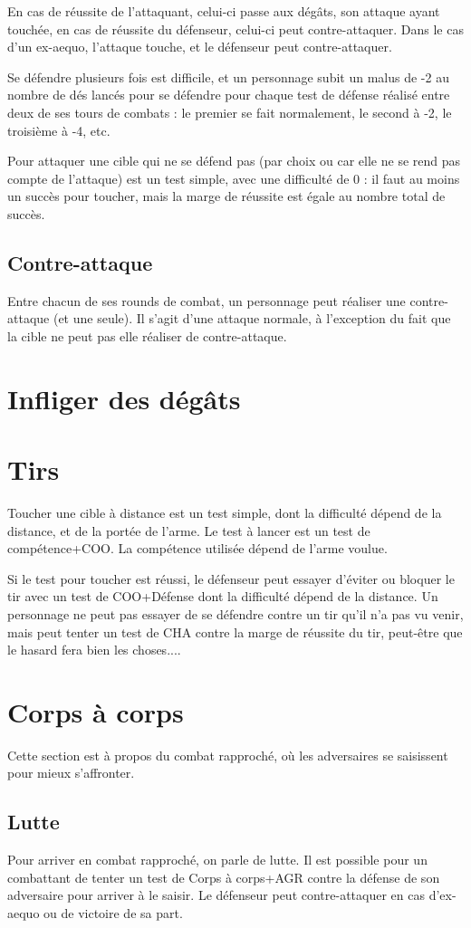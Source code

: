 \documentclass[10pt,a4paper,twocolumn]{book}
\begin{document}
En cas de réussite de l'attaquant, celui-ci passe aux dégâts, son attaque ayant touchée, en cas de réussite du défenseur, celui-ci peut contre-attaquer. Dans le cas d'un ex-aequo, l'attaque touche, et le défenseur peut contre-attaquer.

Se défendre plusieurs fois est difficile, et un personnage subit un malus de -2 au nombre de dés lancés pour se défendre pour chaque test de défense réalisé entre deux de ses tours de combats : le premier se fait normalement, le second à -2, le troisième à -4, etc.

Pour attaquer une cible qui ne se défend pas (par choix ou car elle ne se rend pas compte de l'attaque) est un test simple, avec une difficulté de 0 : il faut au moins un succès pour toucher, mais la marge de réussite est égale au nombre total de succès.
\subsection{Contre-attaque}
Entre chacun de ses rounds de combat, un personnage peut réaliser une contre-attaque (et une seule). Il s'agit d'une attaque normale, à l'exception du fait que la cible ne peut pas elle réaliser de contre-attaque.
\section{Infliger des dégâts}

\section{Tirs}
Toucher une cible à distance est un test simple, dont la difficulté dépend de la distance, et de la portée de l'arme. Le test à lancer est un test de compétence+COO. La compétence utilisée dépend de l'arme voulue.

Si le test pour toucher est réussi, le défenseur peut essayer d'éviter ou bloquer le tir avec un test de COO+Défense dont la difficulté dépend de la distance. Un personnage ne peut pas essayer de se défendre contre un tir qu'il n'a pas vu venir, mais peut tenter un test de CHA contre la marge de réussite du tir, peut-être que le hasard fera bien les choses....


\section{Corps à corps}
Cette section est à propos du combat rapproché, où les adversaires se saisissent pour mieux s'affronter.
\subsection{Lutte}
Pour arriver en combat rapproché, on parle de lutte. Il est possible pour un combattant de tenter un test de Corps à corps+AGR contre la défense de son adversaire pour arriver à le saisir. Le défenseur peut contre-attaquer en cas d'ex-aequo ou de victoire de sa part. 
\end{document}
